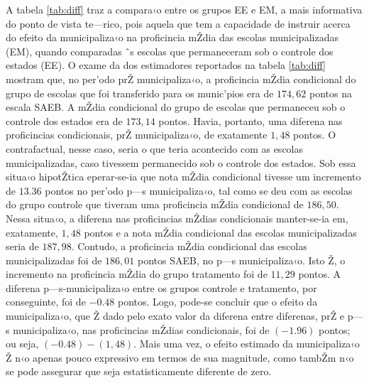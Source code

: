 \documentclass[a4paper, 12pt]{article}
\begin{document}
A tabela \ref{tab:diff} traz a compara‹o entre os grupos EE e EM, a mais informativa do ponto de vista te—rico, pois aquela que tem a capacidade de instruir acerca do efeito da municipaliza‹o na proficincia mŽdia das escolas municipalizadas (EM), quando comparadas ˆs escolas que permaneceram sob o controle dos estados (EE). O exame da dos estimadores reportados na tabela \ref{tab:diff} mostram que, no per’odo prŽ municipaliza‹o, a proficincia mŽdia condicional do grupo de escolas que foi transferido para os munic’pios era de $174,62$ pontos na escala SAEB. A mŽdia condicional do grupo de escolas que permaneceu sob o controle dos estados era de $173,14$ pontos. Havia, portanto, uma diferena nas proficincias condicionais, prŽ municipaliza‹o, de exatamente $1,48$ pontos. O contrafactual, nesse caso, seria o que teria acontecido com as escolas municipalizadas, caso tivessem permanecido sob o controle dos estados. Sob essa situa‹o hipotŽtica eperar-se-ia que nota mŽdia condicional tivesse um incremento de $13.36$ pontos no per’odo p—s municipaliza‹o, tal como se deu com as escolas do grupo controle que tiveram uma proficincia mŽdia condicional de $186,50$. Nessa situa‹o, a diferena nas proficincias mŽdias condicionais manter-se-ia em, exatamente, $1,48$ pontos e a nota mŽdia condicional das escolas municipalizadas seria de $187,98$. Contudo, a proficincia mŽdia condicional das escolas municipalizadas foi de $186,01$ pontos SAEB, no p—s municipaliza‹o. Isto Ž, o incremento na proficincia mŽdia do grupo tratamento foi de $11,29$ pontos. A diferena p—s-municipaliza‹o entre os grupos controle e tratamento, por conseguinte, foi de $-0.48$ pontos. Logo, pode-se concluir que o efeito da municipaliza‹o, que Ž dado pelo exato valor da diferena entre diferenas, prŽ e p—s municipaliza‹o, nas proficincias mŽdias condicionais, foi de $(-1.96)$ pontos; ou seja, $(-0.48)  - (1,48)$.  Mais uma vez, o efeito estimado da municipaliza‹o Ž n‹o apenas pouco expressivo em termos de sua magnitude, como tambŽm n‹o se pode assegurar que seja estatisticamente diferente de zero.




                             
\end{document}
